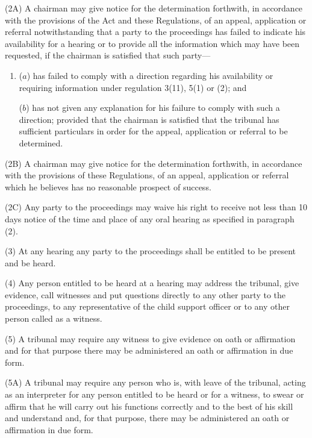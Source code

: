 \documentclass[a4paper]{article}
\begin{document}
(2A) A chairman may give notice for the determination forthwith, in accordance with the provisions of the Act and these Regulations, of an 
appeal, application or referral  %
notwithstanding that a party to the proceedings has failed to indicate his availability for a hearing or to provide all the information which may have been requested, if the chairman is satisfied that such party—
\begin{enumerate}\item[]
($a$) has failed to comply with a direction regarding his availability or requiring information under regulation 3(11), 5(1) or (2); and

($b$) has not given any explanation for his failure to comply with such a direction; provided that the chairman is satisfied that the tribunal has sufficient particulars in order for the 
appeal, application or referral  %
to be determined.
\end{enumerate}

(2B) A chairman may give notice for the determination forthwith, in accordance with the provisions of these Regulations, of an 
appeal, application or referral  %
which he believes has no reasonable prospect of success.

(2C) Any party to the proceedings may waive his right to receive not less than 10 days notice of the time and place of any oral hearing as specified in paragraph (2).

(3) At any hearing any party to the proceedings shall be entitled to be present and be heard.

(4) Any person entitled to be heard at a hearing may address the tribunal, give evidence, call witnesses and put questions directly to any other party to the proceedings, to any representative of the child support officer or to any other person called as a witness.

(5) A tribunal may require any witness to give evidence on oath or affirmation and for that purpose there may be administered an oath or affirmation in due form.

(5A) A tribunal may require any person who is, with leave of the tribunal, acting as an interpreter for any person entitled to be heard or for a witness, to swear or affirm that he will carry out his functions correctly and to the best of his skill and understand and, for that purpose, there may be administered an oath or affirmation in due form.
\end{document}
